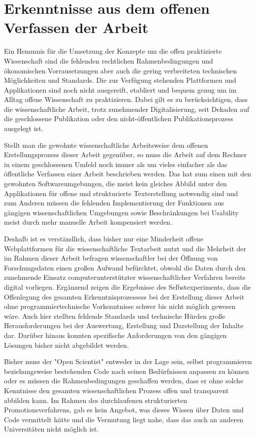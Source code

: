 \section{Erkenntnisse aus dem offenen Verfassen der Arbeit}

Ein Hemmnis für die Umsetzung der Konzepte um die offen praktizierte Wissenschaft sind die fehlenden rechtlichen Rahmenbedingungen und ökonomischen Vorrausetzungen aber auch die gering verbreiteten technischen Möglichkeiten und Standards. Die zur Verfügung stehenden Plattformen und Applikationen sind noch nicht ausgereift, etabliert und bequem genug um im Alltag offene Wissenschaft zu praktizieren. Dabei gilt es zu berücksichtigen, dass die wissenschaftliche Arbeit, trotz zunehmender Digitalisierung, seit Dekaden auf die geschlossene Publikation oder den nicht-öffentlichen Publikationsprozess ausgelegt ist.

Stellt man die gewohnte wissenschaftliche Arbeitsweise dem offenen Erstellungsprozess dieser Arbeit gegenüber, so muss die Arbeit auf dem Rechner in einem geschlossenen Umfeld noch immer als um vieles einfacher als das öffentliche Verfassen einer Arbeit beschrieben werden. Das hat zum einen mit den gewohnten Softwareumgebungen, die meist kein gleiches Abbild unter den Applikationen für offene und  strukturierte Texterstellung notwendig sind und zum Anderen müssen die fehlenden Implementierung der Funktionen aus gängigen wissenschaftlichen Umgebungen sowie Beschränkungen bei Usability meist durch mehr manuelle Arbeit kompensiert werden.

Deshalb ist es verständlich, dass bisher nur eine Minderheit offene Webplattformen für die wissenschaftliche Textarbeit \cite{Perkel_2014} nutzt und die Mehrheit der im Rahmen dieser Arbeit befragen wissenschaftler bei der Öffnung von Forschungsdaten einen großen Aufwand befürchtet, obwohl die Daten durch den zunehmende Einsatz computerunterstützter wissenschaftlicher Verfahren bereits digital vorliegen. Ergänzend zeigen die Ergebnisse des Selbstexperiments, dass die Offenlegung des gesamten Erkenntnisprozessess bei der Erstellung dieser Arbeit ohne programmiertechnische Vorkenntnisse schwer bis nicht möglich gewesen wäre. Auch hier stellten fehlende Standards und technische Hürden große Herausforderungen bei der Auswertung, Erstellung und Darstellung der Inhalte dar. Darüber hinaus konnten spezifische Anforderungen von den gängigen Lösungen bisher nicht abgebildet werden.

Bisher muss der "Open Scientist" entweder in der Lage sein, selbst programmieren beziehungsweise bestehenden Code nach seinen Bedürfnissen anpassen zu können oder es müssen die Rahmenbedingungen geschaffen werden, dass er ohne solche Kenntnisse den gesamten wissenschaftlichen Prozess offen und transparent abbilden kann. Im Rahmen des durchlaufenen strukturierten Promotionsverfahrens, gab es kein Angebot, was dieses Wissen über Daten und Code vermittelt hätte und die Vermutung liegt nahe, dass das auch an anderen Universitäten nicht möglich ist.

